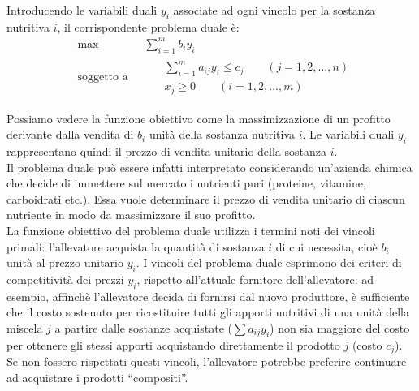 \documentclass[a4paper,11pt]{article}
\begin{document}
Introducendo le variabili duali $y_i$ associate ad ogni vincolo per la sostanza nutritiva $i$, il corrispondente problema duale è:
\begin{equation}\begin{split}
&\text{max}\qquad\qquad\sum_{i=1}^{m}b_iy_i\\
&\text{soggetto a} \qquad\begin{split} &\sum_{i=1}^{m}a_{ij}y_i \leq c_j \qquad(j=1,2,\ldots,n) \\
&x_j\geq0 \qquad(i=1,2,\ldots,m)\end{split}
\end{split}\end{equation}

Possiamo vedere la funzione obiettivo come la massimizzazione di un profitto derivante
dalla  vendita  di $b_i$ unità  della  sostanza nutritiva $i$.  Le  variabili  duali $y_i$ rappresentano quindi  il  prezzo  di  vendita  unitario  della  sostanza $i$.  \\
 Il  problema  duale  può  essere  infatti  interpretato  considerando  un'azienda chimica  che  decide  di  immettere  sul
mercato i nutrienti puri (proteine,  vitamine,  carboidrati  etc.).   Essa vuole  determinare  il  prezzo  di  vendita
unitario di ciascun nutriente in modo da massimizzare il suo profitto. \\ La funzione obiettivo del problema duale utilizza i termini noti dei  vincoli  primali:  l’allevatore  acquista  la  quantità  di  sostanza
$i$ di  cui  necessita,  cioè $b_i$
unità al prezzo unitario $y_i$.  I vincoli del problema duale esprimono dei criteri di competitività dei prezzi $y_i$, rispetto all’attuale fornitore dell’allevatore:  ad esempio, affinchè
l’allevatore  decida  di  fornirsi  dal  nuovo  produttore,  è  sufficiente  che  il  costo  sostenuto per  ricostituire  tutti  gli  apporti  nutritivi  di  una  unità  della  miscela
$j$ a  partire  dalle
sostanze  acquistate  ($\sum a_{ij}y_i$)  non  sia  maggiore  del  costo  per  ottenere  gli  stessi  apporti acquistando direttamente il prodotto
$j$ (costo $c_j$).  Se non fossero rispettati questi
vincoli,  l’allevatore  potrebbe  preferire  continuare  ad  acquistare  i  prodotti  “compositi”.
\\
\end{document}

